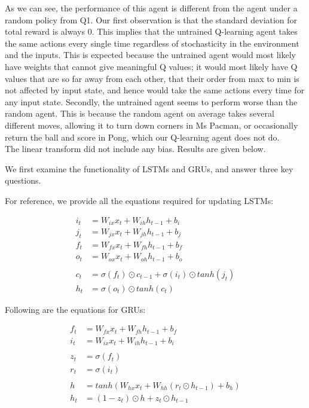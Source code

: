 \documentclass[paper=a4, fontsize=11pt]{scrartcl} %
\numberwithin{equation}{section} %
\numberwithin{figure}{section} %
\numberwithin{table}{section} %
\begin{document}
As we can see, the performance of this agent is different from the agent under a random policy from Q1. Our first observation is that the standard deviation for total reward is always 0. This implies that the untrained Q-learning agent takes the same actions every single time regardless of stochasticity in the environment and the inputs. This is expected because the untrained agent would most likely have weights that cannot give meaningful Q values; it would most likely have Q values that are so far away from each other, that their order from max to min is not affected by input state, and hence would take the same actions every time for any input state. Secondly, the untrained agent seems to perform worse than the random agent. This is because the random agent on average takes several different moves, allowing it to turn down corners in Ms Pacman, or occasionally return the ball and score in Pong, which our Q-learning agent does not do.\\


The linear transform did not include any bias. Results are given below.



We first examine the functionality of LSTMs and GRUs, and answer three key questions.

For reference, we provide all the equations required for updating LSTMs:

\begin{align}
i_t & = W_{ix}x_t + W_{ih}h_{t-1} + b_i\\
j_t & = W_{jx}x_t + W_{jh}h_{t-1} + b_j\\
f_t & = W_{fx}x_t + W_{fh}h_{t-1} + b_f\\
o_t & = W_{ox}x_t + W_{oh}h_{t-1} + b_o\\
\nonumber \\ 
c_t & = \sigma (f_t) \odot c_{t-1} + \sigma (i_t) \odot	 tanh(j_t)\\
h_t & = \sigma (o_t) \odot tanh(c_t)
\end{align}

Following are the equations for GRUs:

\begin{align}
f_t & = W_{fx}x_t + W_{fh}h_{t-1} + b_f\\
i_t & = W_{ix}x_t + W_{ih}h_{t-1} + b_i\\
\nonumber \\
z_t & = \sigma (f_t)\\
r_t & = \sigma (i_t)\\
\nonumber \\ 
h & = tanh(W_{hx}x_t + W_{hh}(r_t \odot h_{t-1}) + b_h)\\
h_t & = (1-z_t) \odot h + z_t \odot h_{t-1}
\end{align}
\end{document}
